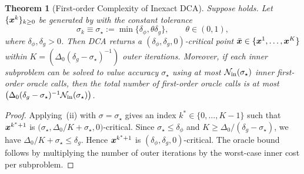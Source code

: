 \documentclass[english]{article}
\newtheorem{theorem}{Theorem}[section]
\begin{document}
\begin{theorem}[First-order Complexity of Inexact DCA]
\label{cor:dca-inexact-target}
Suppose  holds. Let
$\{\bm{x}^k\}_{k\ge0}$ be generated by  with the
constant tolerance
\[
    \sigma_k\equiv\sigma_\star
    :=
    \min\{\delta_\phi,\theta\delta_g\},
    \qquad
    \theta\in(0,1),
\]
where $\delta_\phi,\delta_g>0$. Then DCA returns a
$(\delta_\phi,\delta_g,0)$-critical point
$\bar{\bm{x}}\in\{\bm{x}^1,\ldots,\bm{x}^K\}$ within $K = \left(\Delta_0(\delta_g-\sigma_\star)^{-1}\right)$ outer iterations. Moreover, if each inner subproblem can be solved to value accuracy
$\sigma_\star$ using at most $\mathcal N_{\rm in}(\sigma_\star)$
inner first-order oracle calls, then the total number of 
first-order oracle calls is at most $ \left(\Delta_0(\delta_g-\sigma_\star)^{-1}  \mathcal N_{\rm in}(\sigma_\star) \right)$.
\end{theorem}

\begin{proof}
Applying \,(ii) with
$\sigma=\sigma_\star$ gives an index $k^*\in\{0,\ldots,K-1\}$ such that
$\bm{x}^{k^*+1}$ is
$\bigl(\sigma_\star,\Delta_0/K+\sigma_\star,0\bigr)$-critical. Since
$\sigma_\star\le\delta_\phi$ and
$K\ge\Delta_0/(\delta_g-\sigma_\star)$, we have
$\Delta_0/K+\sigma_\star\le\delta_g$. Hence
$\bm{x}^{k^*+1}$ is $(\delta_\phi,\delta_g,0)$-critical. The oracle bound
follows by multiplying the number of outer iterations by the worst-case
inner cost per subproblem.
\end{proof}
\end{document}
